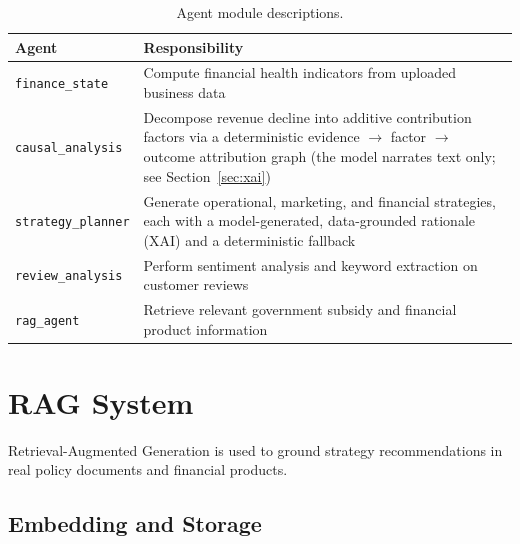 \documentclass[11pt, a4paper]{article}
\begin{document}
\begin{table}[H]
\centering
\caption{Agent module descriptions.}
\label{tab:agents}
\renewcommand{\arraystretch}{1.35}
\begin{tabularx}{\textwidth}{M{3.4cm} L}
\toprule
\textbf{Agent}           & \textbf{Responsibility} \\
\midrule
\texttt{finance\_state}     & Compute financial health indicators from
                              uploaded business data \\
\texttt{causal\_analysis}   & Decompose revenue decline into additive
                              contribution factors via a deterministic
                              evidence $\rightarrow$ factor $\rightarrow$
                              outcome attribution graph (the model narrates
                              text only; see Section~\ref{sec:xai}) \\
\texttt{strategy\_planner}  & Generate operational, marketing, and
                              financial strategies, each with a
                              model-generated, data-grounded rationale (XAI)
                              and a deterministic fallback \\
\texttt{review\_analysis}   & Perform sentiment analysis and keyword
                              extraction on customer reviews \\
\texttt{rag\_agent}         & Retrieve relevant government subsidy
                              and financial product information \\
\bottomrule
\end{tabularx}
\end{table}


\section{RAG System}

Retrieval-Augmented Generation is used to ground strategy
recommendations in real policy documents and financial products.

\subsection{Embedding and Storage}
\end{document}
